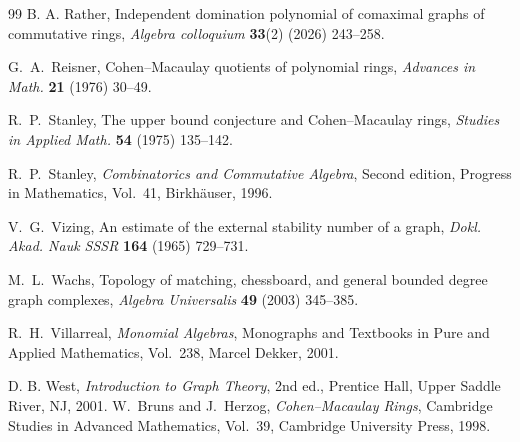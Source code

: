 \documentclass[12pt]{article}
\theoremstyle{plain}
\theoremstyle{definition}
\begin{document}
\begin{thebibliography}{99}
		 B. A. Rather, Independent domination polynomial of comaximal graphs of commutative rings, \emph{Algebra colloquium} \textbf{33}(2) (2026) 243--258.
		
		G.~A.~Reisner,
		\newblock Cohen--Macaulay quotients of polynomial rings,
		\newblock \emph{Advances in Math.} \textbf{21} (1976) 30--49.
		
		R.~P.~Stanley,
		\newblock The upper bound conjecture and Cohen--Macaulay rings,
		\newblock \emph{Studies in Applied Math.} \textbf{54} (1975) 135--142.
		
		R.~P.~Stanley,
		\newblock \emph{Combinatorics and Commutative Algebra},
		\newblock Second edition, Progress in Mathematics, Vol.~41, Birkh\"auser, 1996.
		
		V.~G.~Vizing,
		\newblock An estimate of the external stability number of a graph,
		\newblock \emph{Dokl. Akad. Nauk SSSR} \textbf{164} (1965) 729--731.
		
		M.~L.~Wachs,
		\newblock Topology of matching, chessboard, and general bounded degree graph complexes,
		\newblock \emph{Algebra Universalis} \textbf{49} (2003) 345--385.
		
		R.~H.~Villarreal,
		\newblock \emph{Monomial Algebras},
		\newblock Monographs and Textbooks in Pure and Applied Mathematics, Vol.~238, Marcel Dekker, 2001.
		
		 D. B. West, \emph{Introduction to Graph Theory}, 2nd ed., Prentice Hall, Upper Saddle River, NJ, 2001.
		W.~Bruns and J.~Herzog,
		\newblock \emph{Cohen--Macaulay Rings},
		\newblock Cambridge Studies in Advanced Mathematics, Vol.~39, Cambridge University Press, 1998.
		
		
		
		
		
		
		
		
	\end{thebibliography}
	
\end{document}
